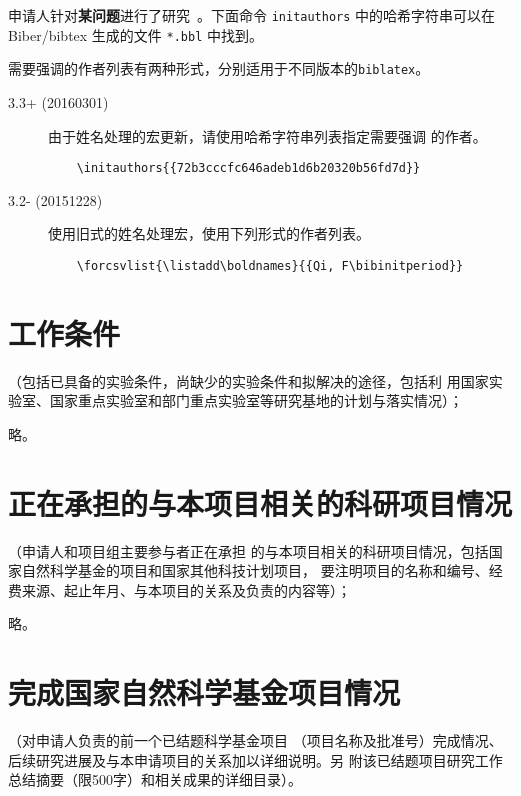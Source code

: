 \documentclass[subfig,boldtoc]{mynsfc}
\begin{document}
\begin{refsection}

  申请人针对\textbf{某问题}进行了研究~\cite{xia_saliency_2015}。下面命令
  \texttt{initauthors} 中的哈希字符串可以在Biber/bibtex 生成的文件
  \texttt{*.bbl} 中找到。

  需要强调的作者列表有两种形式，分别适用于不同版本的\texttt{biblatex}。
  \begin{description}
  \item[3.3+ (20160301)] 由于姓名处理的宏更新，请使用哈希字符串列表指定需要强调
    的作者。
\begin{verbatim}
    \initauthors{{72b3cccfc646adeb1d6b20320b56fd7d}}
\end{verbatim}
  \item[3.2- (20151228)] 使用旧式的姓名处理宏，使用下列形式的作者列表。
\begin{verbatim}
    \forcsvlist{\listadd\boldnames}{{Qi, F\bibinitperiod}}
\end{verbatim}
  \end{description}

  \printbibliography[prefixnumbers=J,heading=cvtype,title={相关工作}]

\end{refsection}

\section{工作条件}{（包括已具备的实验条件，尚缺少的实验条件和拟解决的途径，包括利
  用国家实验室、国家重点实验室和部门重点实验室等研究基地的计划与落实情况）；}
\label{sec:condition}

略。
\section{正在承担的与本项目相关的科研项目情况}{（申请人和项目组主要参与者正在承担
  的与本项目相关的科研项目情况，包括国家自然科学基金的项目和国家其他科技计划项目，
  要注明项目的名称和编号、经费来源、起止年月、与本项目的关系及负责的内容等）；}
\label{sec:projects}

略。

\section{完成国家自然科学基金项目情况}{（对申请人负责的前一个已结题科学基金项目
  （项目名称及批准号）完成情况、后续研究进展及与本申请项目的关系加以详细说明。另
  附该已结题项目研究工作总结摘要（限500字）和相关成果的详细目录）。}
\label{sec:finished-project}
\end{document}
